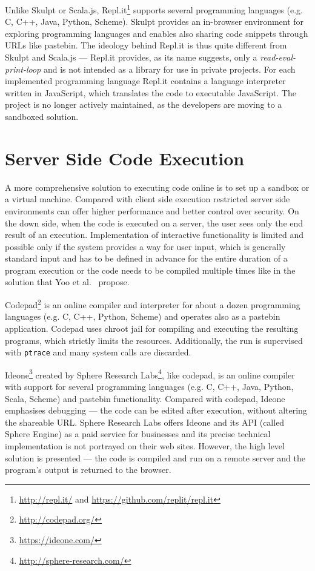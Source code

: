 Unlike Skulpt or Scala.js, Repl.it\footnote{ \url{http://repl.it/} and \url{https://github.com/replit/repl.it}} supports several programming languages (e.g. C, C++, Java, Python, Scheme). Skulpt provides an in-browser environment for exploring programming languages and enables also sharing code snippets through URLs like pastebin. The ideology behind Repl.it is thus quite different from Skulpt and Scala.js --- Repl.it provides, as its name suggests, only a \emph{read-eval-print-loop} and is not intended as a library for use in private projects. For each implemented programming language Repl.it contains a language interpreter written in JavaScript, which translates the code to executable JavaScript. The project is no longer actively maintained, as the developers are moving to a sandboxed solution.


\section{Server Side Code Execution}
\label{section:server}

A more comprehensive solution to executing code online is to set up a sandbox or a virtual machine. Compared with client side execution restricted server side environments can offer higher performance and better control over security. On the down side, when the code is executed on a server, the user sees only the end result of an execution. Implementation of interactive functionality is limited and possible only if the system provides a way for user input, which is generally standard input and has to be defined in advance for the entire duration of a program execution or the code needs to be compiled multiple times like in the solution that Yoo et al.~\cite{yoo:2011} propose.

Codepad\footnote{ \url{http://codepad.org/}} is an online compiler and interpreter for about a dozen programming languages (e.g. C, C++, Python, Scheme) and operates also as a pastebin application. Codepad uses chroot jail for compiling and executing the resulting programs, which strictly limits the resources. Additionally, the run is supervised with \texttt{ptrace} and many system calls are discarded.

Ideone\footnote{ \url{https://ideone.com/}} created by Sphere Research Labs\footnote{ \url{http://sphere-research.com/}}, like codepad, is an online compiler with support for several programming languages (e.g. C, C++, Java, Python, Scala, Scheme) and pastebin functionality. Compared with codepad, Ideone emphasises debugging --- the code can be edited after execution, without altering the shareable URL. Sphere Research Labs offers Ideone and its API (called Sphere Engine) as a paid service for businesses and its precise technical implementation is not portrayed on their web sites. However, the high level solution is presented --- the code is compiled and run on a remote server and the program's output is returned to the browser.

